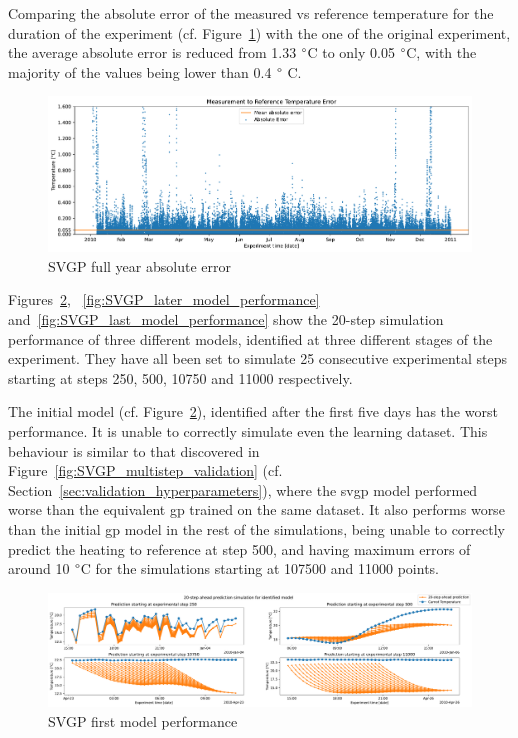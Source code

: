 \clearpage

Comparing the absolute error of the measured vs reference temperature for the
duration of the experiment (cf. Figure~\ref{fig:SVGP_fullyear_abserr}) with the
one of the original experiment, the average absolute error is reduced from 1.33
$\degree$C to only 0.05 $\degree$C, with the majority of the values being lower
than 0.4 $\degree$ C. 

\begin{figure}[ht]
    \centering
    \includegraphics[width =
    \textwidth]{Plots/1_SVGP_480pts_inf_window_12_averageYear_abserr.pdf}
    \caption{SVGP full year absolute error}
    \label{fig:SVGP_fullyear_abserr}
\end{figure}

Figures~\ref{fig:SVGP_first_model_performance},
~\ref{fig:SVGP_later_model_performance}
and~\ref{fig:SVGP_last_model_performance} show the 20-step simulation performance of three
different models, identified at three different stages of the experiment. They
have all been set to simulate 25 consecutive experimental steps starting at
steps 250, 500, 10750 and 11000 respectively.

The initial model (cf. Figure~\ref{fig:SVGP_first_model_performance}),
identified after the first five days has the worst performance. It is unable to
correctly simulate even the learning dataset. This behaviour is similar to that
discovered in Figure~\ref{fig:SVGP_multistep_validation}
(cf. Section~\ref{sec:validation_hyperparameters}), where the \acrshort{svgp}
model performed worse than the equivalent \acrshort{gp} trained on the same
dataset. It also performs worse than the initial \acrshort{gp} model in the rest
of the simulations, being unable to correctly predict the heating to reference
at step 500, and having maximum errors of around 10 $\degree$C for the simulations
starting at 107500 and 11000 points.

\begin{figure}[ht]
    \centering
    \includegraphics[width =
    \textwidth]{Plots/1_SVGP_480pts_inf_window_12_averageYear_first_model_performance.pdf}
    \caption{SVGP first model performance}
    \label{fig:SVGP_first_model_performance}
\end{figure}

